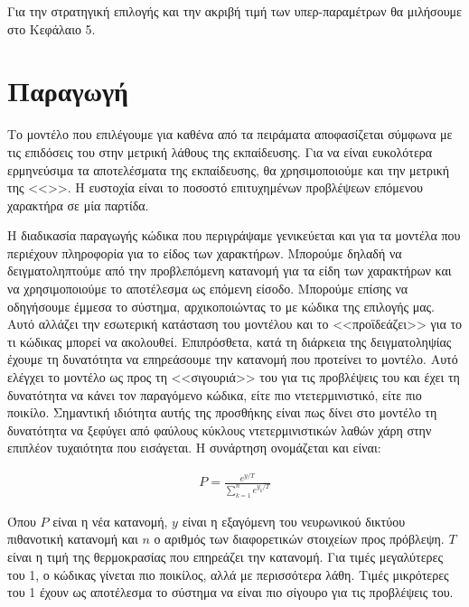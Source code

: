 Για την στρατηγική επιλογής και την ακριβή τιμή των υπερ-παραμέτρων θα μιλήσουμε στο Κεφάλαιο 5.

\section{Παραγωγή}

Το μοντέλο που επιλέγουμε για καθένα από τα πειράματα αποφασίζεται σύμφωνα με τις επιδόσεις του στην μετρική λάθους της εκπαίδευσης.
Για να είναι ευκολότερα ερμηνεύσιμα τα αποτελέσματα της εκπαίδευσης, θα χρησιμοποιούμε και την μετρική της <<>>.
Η ευστοχία είναι το ποσοστό επιτυχημένων προβλέψεων επόμενου χαρακτήρα σε μία παρτίδα.

Η διαδικασία παραγωγής κώδικα που περιγράψαμε γενικεύεται και για τα μοντέλα που περιέχουν πληροφορία για το είδος των χαρακτήρων.
Μπορούμε δηλαδή να δειγματοληπτούμε από την προβλεπόμενη κατανομή για τα είδη των χαρακτήρων και να χρησιμοποιούμε το αποτέλεσμα ως επόμενη είσοδο.
Μπορούμε επίσης να οδηγήσουμε έμμεσα το σύστημα, αρχικοποιώντας το με κώδικα της επιλογής μας. Αυτό αλλάζει την εσωτερική κατάσταση του μοντέλου και το <<προϊδεάζει>> για το τι κώδικας μπορεί να ακολουθεί. 
Επιπρόσθετα, κατά τη διάρκεια της δειγματοληψίας έχουμε τη δυνατότητα να επηρεάσουμε την κατανομή που προτείνει το μοντέλο.
Αυτό ελέγχει το μοντέλο ως προς τη <<σιγουριά>> του για τις προβλέψεις του και έχει τη δυνατότητα να κάνει τον παραγόμενο κώδικα, είτε πιο ντετερμινιστικό, είτε πιο ποικίλο.
Σημαντική ιδιότητα αυτής της προσθήκης είναι πως δίνει στο μοντέλο τη δυνατότητα να ξεφύγει από φαύλους κύκλους ντετερμινιστικών λαθών χάρη στην επιπλέον τυχαιότητα που εισάγεται.
Η συνάρτηση ονομάζεται  και είναι: 

\begin{ceqn}
\begin{align}
P = \frac{e^{y/T}}{\sum_{k = 1}^{n} e^{y_k/T}}
\end{align}
\end{ceqn}

Όπου $P$ είναι η νέα κατανομή, $y$ είναι η εξαγόμενη του νευρωνικού δικτύου πιθανοτική κατανομή και $n$ ο αριθμός των διαφορετικών στοιχείων προς πρόβλεψη. $T$ είναι η τιμή της θερμοκρασίας που επηρεάζει την  κατανομή.
Για τιμές μεγαλύτερες του 1, ο κώδικας γίνεται πιο ποικίλος, αλλά με περισσότερα λάθη.
Τιμές μικρότερες του 1 έχουν ως αποτέλεσμα το σύστημα να είναι πιο σίγουρο για τις προβλέψεις του.



